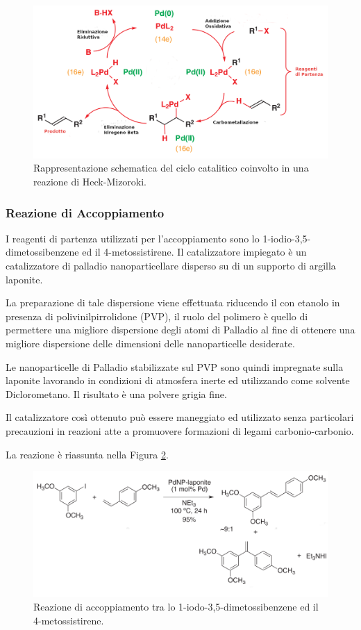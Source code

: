 \documentclass[a4paper, 12pt]{article}
\begin{document}
\begin{figure}[H]
	\centering
	\includegraphics[width=\linewidth]{immagini/heck.png}
	\caption{Rappresentazione schematica del ciclo catalitico coinvolto in una reazione di Heck-Mizoroki.}
	\label{fig:heck}
\end{figure}

\subsubsection{Reazione di Accoppiamento}
I reagenti di partenza utilizzati per l'accoppiamento sono lo 1-iodio-3,5-dimetossibenzene ed il 4-metossistirene. Il catalizzatore impiegato è un catalizzatore di palladio nanoparticellare disperso su di un supporto di argilla laponite.

La preparazione di tale dispersione viene effettuata riducendo il  con etanolo in presenza di polivinilpirrolidone (PVP), il ruolo del polimero è quello di permettere una migliore dispersione degli atomi di Palladio al fine di ottenere una migliore dispersione delle dimensioni delle nanoparticelle desiderate.

Le nanoparticelle di Palladio stabilizzate sul PVP sono quindi impregnate sulla laponite lavorando in condizioni di atmosfera inerte ed utilizzando come solvente Diclorometano. Il risultato è una polvere grigia fine.\cite{martinez_extremely_2015}

Il catalizzatore così ottenuto può essere maneggiato ed utilizzato senza particolari precauzioni in reazioni atte a promuovere formazioni di legami carbonio-carbonio.

La reazione è riassunta nella Figura \ref{fig:h-m_resveratrolo}.

\begin{figure}[H]
	\centering
	\includegraphics[width=\linewidth]{immagini/h-m_resveratrolo.png}
	\caption{Reazione di accoppiamento tra lo 1-iodo-3,5-dimetossibenzene ed il 4-metossistirene.}
	\label{fig:h-m_resveratrolo}
\end{figure}
\end{document}
